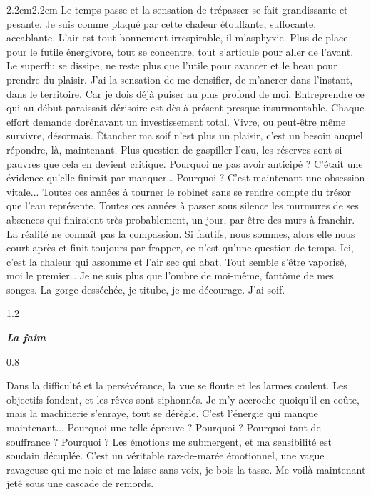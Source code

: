 \begin{adjustwidth}{2.2cm}{2.2cm}
Le temps passe et la sensation de trépasser se fait grandissante et pesante. Je suis comme plaqué par cette chaleur étouffante, suffocante, accablante. L’air est tout bonnement irrespirable, il m’asphyxie. Plus de place pour le futile énergivore, tout se concentre, tout s’articule pour aller de l’avant. Le superflu se dissipe, ne reste plus que l’utile pour avancer et le beau pour prendre du plaisir. J’ai la sensation de me densifier, de m’ancrer dans l’instant, dans le territoire. Car je dois déjà puiser au plus profond de moi. Entreprendre ce qui au début paraissait dérisoire est dès à présent presque insurmontable. Chaque effort demande dorénavant un investissement total. Vivre, ou peut-être même survivre, désormais. Étancher ma soif n’est plus un plaisir, c’est un besoin auquel répondre, là, maintenant. Plus question de gaspiller l’eau, les réserves sont si pauvres que cela en devient critique. Pourquoi ne pas avoir anticipé ? C’était une évidence qu’elle finirait par manquer… Pourquoi ? C’est maintenant une obsession vitale... Toutes ces années à tourner le robinet sans se rendre compte du trésor que l’eau représente. Toutes ces années à passer sous silence les murmures de ses absences qui finiraient très probablement, un jour, par être des murs à franchir. La réalité ne connaît pas la compassion. Si fautifs, nous sommes, alors elle nous court après et finit toujours par frapper, ce n’est qu’une question de temps. Ici, c’est la chaleur qui assomme et l’air sec qui abat. Tout semble s’être vaporisé, moi le premier… Je ne suis plus que l’ombre de moi-même, fantôme de mes songes. La gorge desséchée, je titube, je me décourage. J’ai soif.
\begin{spacing}{1.2}
~
\end{spacing}
\begin{center}
\textbf{\textit{La faim}}
\end{center}
\begin{spacing}{0.8}
~
\end{spacing}
Dans la difficulté et la persévérance, la vue se floute et les larmes coulent. Les objectifs fondent, et les rêves sont siphonnés. Je m’y accroche quoiqu’il en coûte, mais la machinerie s’enraye, tout se dérègle. C’est l’énergie qui manque maintenant... Pourquoi une telle épreuve ? Pourquoi ? Pourquoi tant de souffrance ? Pourquoi ?  Les émotions me submergent, et ma sensibilité est soudain décuplée. C’est un véritable raz-de-marée émotionnel, une vague ravageuse qui me noie et me laisse sans voix, je bois la tasse. Me voilà maintenant jeté sous une cascade de remords.


\end{adjustwidth}
